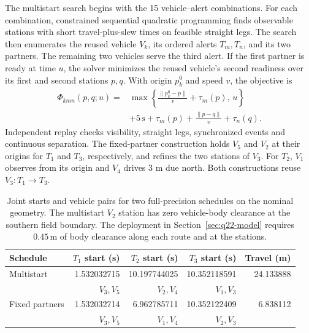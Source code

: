 \documentclass{swmcmthesis}
\begin{document}
The multistart search begins with the 15 vehicle--alert combinations. For each combination, constrained sequential quadratic programming finds observable stations with short travel-plus-slew times on feasible straight legs. The search then enumerates the reused vehicle \(V_k\), its ordered alerts \(T_m,T_n\), and its two partners. The remaining two vehicles serve the third alert. If the first partner is ready at time \(u\), the solver minimizes the reused vehicle's second readiness over its first and second stations \(p,q\). With origin \(p_k^0\) and speed \(v\), the objective is
\begin{equation}
\label{eq:q22-multistart-objective}
\begin{aligned}
\Phi_{kmn}(p,q;u)={}&\max\!\left\{\frac{\|p_k^0-p\|}{v}+\tau_m(p),\,u\right\}\\
&+5\,\mathrm s+\tau_m(p)+\frac{\|p-q\|}{v}+\tau_n(q).
\end{aligned}
\end{equation}
Independent replay checks visibility, straight legs, synchronized events and continuous separation. The fixed-partner construction holds \(V_5\) and \(V_2\) at their origins for \(T_1\) and \(T_3\), respectively, and refines the two stations of \(V_3\). For \(T_2\), \(V_1\) observes from its origin and \(V_4\) drives 3 m due north. Both constructions reuse \(V_3:T_1\to T_3\).

\begin{table}[!htbp]
    \centering
    \caption{Joint starts and vehicle pairs for two full-precision schedules on the nominal geometry. The multistart \(V_2\) station has zero vehicle-body clearance at the southern field boundary. The deployment in Section~\ref{sec:q22-model} requires \(0.45\,\mathrm m\) of body clearance along each route and at the stations.}
    \label{tab:q22-alternatives}
    \setlength{\tabcolsep}{4pt}
    \begin{tabular}{@{}lrrrr@{}}
        \toprule
        Schedule & \(T_1\) start (s) & \(T_2\) start (s) & \(T_3\) start (s) & Travel (m) \\
        \midrule
        Multistart & 1.532032715 & 10.197744025 & 10.352118591 & 24.133888 \\
        & \(V_3,V_5\) & \(V_2,V_4\) & \(V_1,V_3\) & \\
        Fixed partners & 1.532032714 & 6.962785711 & 10.352122409 & 6.838112 \\
        & \(V_3,V_5\) & \(V_1,V_4\) & \(V_2,V_3\) & \\
        \bottomrule
    \end{tabular}
\end{table}
\end{document}

